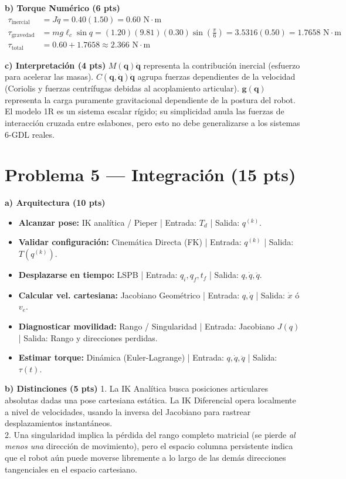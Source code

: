 \documentclass[11pt, a4paper]{article}
\begin{document}
\textbf{b) Torque Numérico (6 pts)}
\begin{align*}
    \tau_{\text{inercial}} &= J\ddot{q} = 0.40(1.50) = \boxed{ 0.60 \text{ N}\cdot\text{m} } \text{} \\
    \tau_{\text{gravedad}} &= mg\ell_c\sin q = (1.20)(9.81)(0.30)\sin\left(\frac{\pi}{6}\right) = 3.5316(0.50) = \boxed{ 1.7658 \text{ N}\cdot\text{m} } \text{} \\
    \tau_{\text{total}} &= 0.60 + 1.7658 \approx \boxed{ 2.366 \text{ N}\cdot\text{m} } \text{}
\end{align*}

\textbf{c) Interpretación (4 pts)}
$M(\mathbf{q})\ddot{\mathbf{q}}$ representa la contribución inercial (esfuerzo para acelerar las masas). $C(\mathbf{q}, \dot{\mathbf{q}})\dot{\mathbf{q}}$ agrupa fuerzas dependientes de la velocidad (Coriolis y fuerzas centrífugas debidas al acoplamiento articular). $\mathbf{g}(\mathbf{q})$ representa la carga puramente gravitacional dependiente de la postura del robot. El modelo 1R es un sistema escalar rígido; su simplicidad anula las fuerzas de interacción cruzada entre eslabones, pero esto no debe generalizarse a los sistemas 6-GDL reales.

\section*{Problema 5 — Integración (15 pts)}

\textbf{a) Arquitectura (10 pts)}
\begin{itemize}
    \item \textbf{Alcanzar pose:} IK analítica / Pieper | Entrada: $T_d$ | Salida: $q^{(k)}$.
    \item \textbf{Validar configuración:} Cinemática Directa (FK) | Entrada: $q^{(k)}$ | Salida: $T(q^{(k)})$.
    \item \textbf{Desplazarse en tiempo:} LSPB | Entrada: $q_i, q_f, t_f$ | Salida: $q, \dot{q}, \ddot{q}$.
    \item \textbf{Calcular vel. cartesiana:} Jacobiano Geométrico | Entrada: $q, \dot{q}$ | Salida: $\dot{x}$ ó $v_e$.
    \item \textbf{Diagnosticar movilidad:} Rango / Singularidad | Entrada: Jacobiano $J(q)$ | Salida: Rango y direcciones perdidas.
    \item \textbf{Estimar torque:} Dinámica (Euler-Lagrange) | Entrada: $q, \dot{q}, \ddot{q}$ | Salida: $\tau(t)$.
\end{itemize}

\textbf{b) Distinciones (5 pts)}
1. La IK Analítica busca posiciones articulares absolutas dadas una pose cartesiana estática. La IK Diferencial opera localmente a nivel de velocidades, usando la inversa del Jacobiano para rastrear desplazamientos instantáneos. \\
2. Una singularidad implica la pérdida del rango completo matricial (se pierde \textit{al menos una} dirección de movimiento), pero el espacio columna persistente indica que el robot aún puede moverse libremente a lo largo de las demás direcciones tangenciales en el espacio cartesiano.
\end{document}
